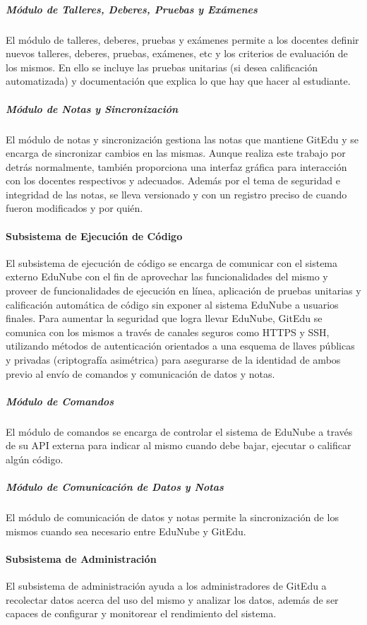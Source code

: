 \subparagraph{Módulo de Talleres, Deberes, Pruebas y Exámenes}
El módulo de talleres, deberes, pruebas y exámenes permite a los docentes definir nuevos talleres, deberes, pruebas, exámenes, etc y los criterios de evaluación de los mismos. En ello se incluye las pruebas unitarias (si desea calificación automatizada) y documentación que explica lo que hay que hacer al estudiante.

\subparagraph{Módulo de Notas y Sincronización}
El módulo de notas y sincronización gestiona las notas que mantiene GitEdu y se encarga de sincronizar cambios en las mismas. Aunque realiza este trabajo por detrás normalmente, también proporciona una interfaz gráfica para interacción con los docentes respectivos y adecuados. Además por el tema de seguridad e integridad de las notas, se lleva versionado y con un registro preciso de cuando fueron modificados y por quién.

\paragraph{Subsistema de Ejecución de Código}
 
El subsistema de ejecución de código se encarga de comunicar con el sistema externo EduNube con el fin de aprovechar las funcionalidades del mismo y proveer de funcionalidades de ejecución en línea, aplicación de pruebas unitarias y calificación automática de código sin exponer al sistema EduNube a usuarios finales. Para aumentar la seguridad que logra llevar EduNube, GitEdu se comunica con los mismos a través de canales seguros como HTTPS y SSH, utilizando métodos de autenticación orientados a una esquema de llaves públicas y privadas (criptografía asimétrica) para asegurarse de la identidad de ambos previo al envío de comandos y comunicación de datos y notas.

\subparagraph{Módulo de Comandos}
 
El módulo de comandos se encarga de controlar el sistema de EduNube a través de su API externa para indicar al mismo cuando debe bajar, ejecutar o calificar algún código.

\subparagraph{Módulo de Comunicación de Datos y Notas}
El módulo de comunicación de datos y notas permite la sincronización de los mismos cuando sea necesario entre EduNube y GitEdu.

\paragraph{Subsistema de Administración}
El subsistema de administración ayuda a los administradores de GitEdu a recolectar datos acerca del uso del mismo y analizar los datos, además de ser capaces de configurar y monitorear el rendimiento del sistema.

